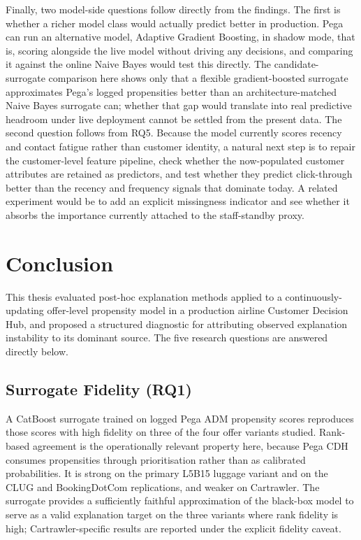 \documentclass[oneside]{memoir} %
\begin{document}
Finally, two model-side questions follow directly from the findings. The first is whether a richer model class would actually predict better in production. Pega can run an alternative model, Adaptive Gradient Boosting, in shadow mode, that is, scoring alongside the live model without driving any decisions, and comparing it against the online Naive Bayes would test this directly. The candidate-surrogate comparison here shows only that a flexible gradient-boosted surrogate approximates Pega's logged propensities better than an architecture-matched Naive Bayes surrogate can; whether that gap would translate into real predictive headroom under live deployment cannot be settled from the present data. The second question follows from RQ5. Because the model currently scores recency and contact fatigue rather than customer identity, a natural next step is to repair the customer-level feature pipeline, check whether the now-populated customer attributes are retained as predictors, and test whether they predict click-through better than the recency and frequency signals that dominate today. A related experiment would be to add an explicit missingness indicator and see whether it absorbs the importance currently attached to the staff-standby proxy.

\chapter{Conclusion} \label{Conclusion}

This thesis evaluated post-hoc explanation methods applied to a continuously-updating offer-level propensity model in a production airline Customer Decision Hub, and proposed a structured diagnostic for attributing observed explanation instability to its dominant source. The five research questions are answered directly below.

\section{Surrogate Fidelity (RQ1)}

A CatBoost surrogate trained on logged Pega ADM propensity scores reproduces those scores with high fidelity on three of the four offer variants studied. Rank-based agreement is the operationally relevant property here, because Pega CDH consumes propensities through prioritisation rather than as calibrated probabilities. It is strong on the primary L5B15 luggage variant and on the CLUG and BookingDotCom replications, and weaker on Cartrawler. The surrogate provides a sufficiently faithful approximation of the black-box model to serve as a valid explanation target on the three variants where rank fidelity is high; Cartrawler-specific results are reported under the explicit fidelity caveat.
\end{document}
